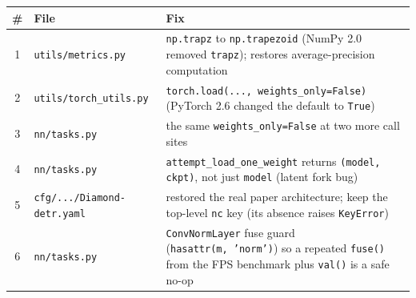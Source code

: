 \documentclass[11pt,a4paper]{article}
\begin{document}
\begin{table}[H]
\centering
\small
\renewcommand{\arraystretch}{1.25}
\begin{tabularx}{\textwidth}{c l X}
\toprule
\textbf{\#} & \textbf{File} & \textbf{Fix} \\
\midrule
1 & \texttt{utils/metrics.py} & \texttt{np.trapz} to \texttt{np.trapezoid} (NumPy 2.0 removed \texttt{trapz}); restores average-precision computation \\
2 & \texttt{utils/torch\_utils.py} & \texttt{torch.load(..., weights\_only=False)} (PyTorch 2.6 changed the default to \texttt{True}) \\
3 & \texttt{nn/tasks.py} & the same \texttt{weights\_only=False} at two more call sites \\
4 & \texttt{nn/tasks.py} & \texttt{attempt\_load\_one\_weight} returns \texttt{(model, ckpt)}, not just \texttt{model} (latent fork bug) \\
5 & \texttt{cfg/.../Diamond-detr.yaml} & restored the real paper architecture; keep the top-level \texttt{nc} key (its absence raises \texttt{KeyError}) \\
6 & \texttt{nn/tasks.py} & \texttt{ConvNormLayer} fuse guard (\texttt{hasattr(m,\,'norm')}) so a repeated \texttt{fuse()} from the FPS benchmark plus \texttt{val()} is a safe no-op \\
\bottomrule
\end{tabularx}
\end{table}
\end{document}
